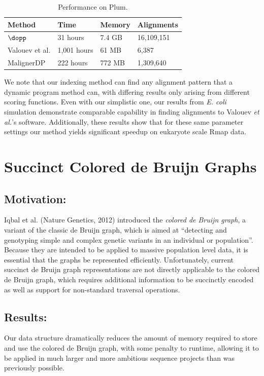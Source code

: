 \documentclass[doctor]{thesis}
\begin{document}
\begin{table}[h!]
  \small
  \centering
  \begin{tabular}{l|l|l|l}
	{\bf Method}	& {\bf Time}		& {\bf Memory} 	& {\bf Alignments } \\
	\hline
	\hline

   	 $\dopp$    	 	& 31 hours		& 7.4 GB  & 16,109,151 \\
	Valouev et al. 		& 1,001 hours 	& 61 MB		&  6,387  \\
    MalignerDP          & 222 hours     & 772 MB    & 1,309,640 \\
	\end{tabular}
      \caption{Performance on Plum.}
 \label{tbl-plum}
\end{table}

We note that our indexing method can find any alignment pattern that a dynamic program method can, with differing results only arising from different scoring functions.  Even with our simplistic one, our results from \emph{E. coli} simulation demonstrate comparable capability in finding alignments to Valouev {\it et al.}'s software.  Additionally, these results show that for these same parameter settings our method yields significant speedup on eukaryote scale Rmap data.  



 

\chapter{Succinct Colored de Bruijn Graphs}
\makeatletter{}




  \section{Motivation:}
  Iqbal et al. (Nature Genetics, 2012) introduced the {\em colored de Bruijn graph}, a variant of the classic de Bruijn graph, which is aimed at ``detecting and genotyping simple and complex genetic variants in an individual or population''.
Because they are intended to be applied to massive population level data, it is essential that the graphs be represented efficiently.
Unfortunately, current succinct de Bruijn graph representations are not directly applicable to the colored de Bruijn graph, which requires additional information to be succinctly encoded as well as support for non-standard traversal operations.
\section{Results:}
Our data structure dramatically reduces the amount of memory required to store and use the colored de Bruijn graph, with some penalty to runtime, allowing it to be applied in much larger and more ambitious sequence projects than was previously possible.
\end{document}
